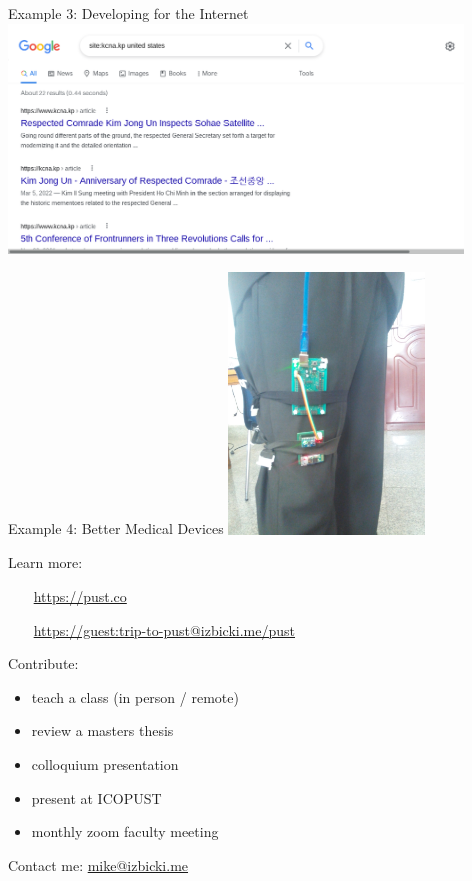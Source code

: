 \documentclass{beamer}
\newcommand{\imgslide}[1]{
{
\usebackgroundtemplate{\texttt{[image: \#1]} }
\begin{frame}{}
\end{frame}
}
}
\begin{document}
\begin{frame}{Example 3: Developing for the Internet}
    \includegraphics[width=4.75in]{img/kcna-google}
\end{frame}

\begin{frame}{Example 4: Better Medical Devices}
    \centering
    \includegraphics[width=2.05in]{img/medical-device}
\end{frame}

\begin{frame}{}
%
%

    \Large
%
%

    Learn more:

    ~~~ \url{https://pust.co}

    ~~~ \url{https://guest:trip-to-pust@izbicki.me/pust}

    \vspace{0.2in}
    Contribute:
    \begin{itemize}
        \item teach a class (in person / remote)
        \item review a masters thesis
        \item colloquium presentation
        \item present at ICOPUST
        \item monthly zoom faculty meeting
    \end{itemize}

    \vspace{0.2in}
    Contact me: \url{mike@izbicki.me}
\end{frame}
\end{document}
